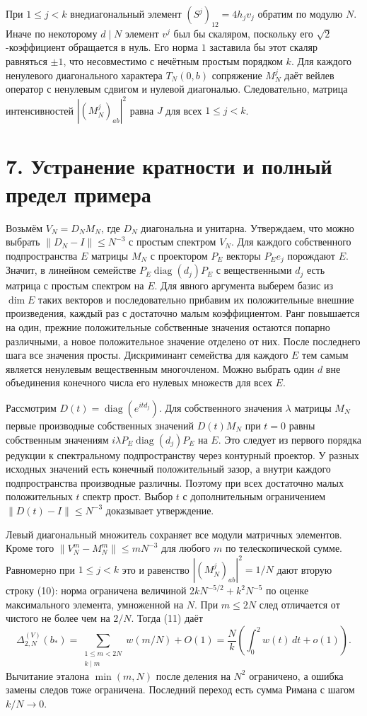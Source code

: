 \documentclass[11pt,a4paper]{article}
\newcommand{\sect}[1]{\section*{\sffamily\color{ink}#1}}
\begin{document}
При $1\le j<k$ внедиагональный элемент $(S^j)_{12}=4h_jv_j$ обратим по модулю $N$. Иначе по некоторому $d\mid N$ элемент $v^j$ был бы скаляром, поскольку его $\sqrt2$-коэффициент обращается в нуль. Его норма $1$ заставила бы этот скаляр равняться $\pm1$, что несовместимо с нечётным простым порядком $k$. Для каждого ненулевого диагонального характера $T_N(0,b)$ сопряжение $M_N^j$ даёт вейлев оператор с ненулевым сдвигом и нулевой диагональю. Следовательно, матрица интенсивностей $|(M_N^j)_{ab}|^2$ равна $J$ для всех $1\le j<k$.
\newpage
\sect{7. Устранение кратности и полный предел примера}
Возьмём $V_N=D_NM_N$, где $D_N$ диагональна и унитарна. Утверждаем, что можно выбрать $\|D_N-I\|\le N^{-3}$ с простым спектром $V_N$. Для каждого собственного подпространства $E$ матрицы $M_N$ с проектором $P_E$ векторы $P_E e_j$ порождают $E$. Значит, в линейном семействе $P_E\operatorname{diag}(d_j)P_E$ с вещественными $d_j$ есть матрица с простым спектром на $E$. Для явного аргумента выберем базис из $\dim E$ таких векторов и последовательно прибавим их положительные внешние произведения, каждый раз с достаточно малым коэффициентом. Ранг повышается на один, прежние положительные собственные значения остаются попарно различными, а новое положительное значение отделено от них. После последнего шага все значения просты. Дискриминант семейства для каждого $E$ тем самым является ненулевым вещественным многочленом. Можно выбрать один $d$ вне объединения конечного числа его нулевых множеств для всех $E$.

Рассмотрим $D(t)=\operatorname{diag}(e^{itd_j})$. Для собственного значения $\lambda$ матрицы $M_N$ первые производные собственных значений $D(t)M_N$ при $t=0$ равны собственным значениям $i\lambda P_E\operatorname{diag}(d_j)P_E$ на $E$. Это следует из первого порядка редукции к спектральному подпространству через контурный проектор. У разных исходных значений есть конечный положительный зазор, а внутри каждого подпространства производные различны. Поэтому при всех достаточно малых положительных $t$ спектр прост. Выбор $t$ с дополнительным ограничением $\|D(t)-I\|\le N^{-3}$ доказывает утверждение.

Левый диагональный множитель сохраняет все модули матричных элементов. Кроме того $\|V_N^m-M_N^m\|\le mN^{-3}$ для любого $m$ по телескопической сумме. Равномерно при $1\le j<k$ это и равенство $|(M_N^j)_{ab}|^2=1/N$ дают вторую строку (10): норма ограничена величиной $2kN^{-5/2}+k^2N^{-5}$ по оценке максимального элемента, умноженной на $N$. При $m\le2N$ след отличается от чистого не более чем на $2/N$. Тогда (11) даёт
\[
  \Delta_{2,N}^{(V)}(b_*)
       =\sum_{\substack{1\le m<2N\\ k\mid m}} w(m/N)+O(1)
       =\frac Nk\left(\int_0^2 w(t)\,dt+o(1)\right).
\]
Вычитание эталона $\min(m,N)$ после деления на $N^2$ ограничено, а ошибка замены следов тоже ограничена. Последний переход есть сумма Римана с шагом $k/N\to0$.
\end{document}
